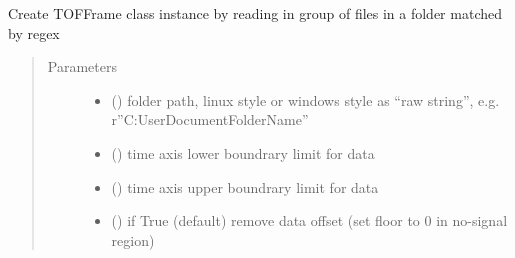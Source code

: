 \documentclass[letterpaper,10pt,english]{sphinxmanual}
\begin{document}

\begin{fulllineitems}
\label{\detokenize{scibeam.core:scibeam.core.tofframe.read_folder}}
Create TOFFrame class instance by reading in group of files in a folder matched by regex
\begin{quote}\begin{description}
\item[{Parameters}] \leavevmode\begin{itemize}
\item {} 
 () \textendash{} folder path, linux style or windows style as “raw string”, e.g. r”C:UserDocumentFolderName”

\item {} 
 () \textendash{} time axis lower boundrary limit for data

\item {} 
 () \textendash{} time axis upper boundrary limit for data

\item {} 
 () \textendash{} if True (default) remove data offset (set floor to 0 in no-signal region)


\end{itemize}
\end{description}
\end{quote}
\end{fulllineitems}
\end{document}
